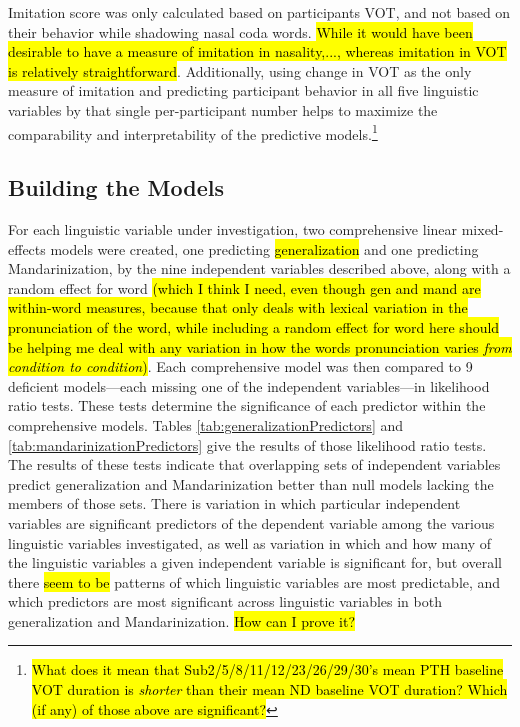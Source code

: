 Imitation score was only calculated based on participants VOT, and not based on their behavior while shadowing nasal coda words. \hl{While it would have been desirable to have a measure of imitation in nasality,..., whereas imitation in VOT is relatively straightforward}. Additionally, using change in VOT as the only measure of imitation and predicting participant behavior in all five linguistic variables by that single per-participant number helps to maximize the comparability and interpretability of the predictive models.\footnote{\hl{What does it mean that Sub2/5/8/11/12/23/26/29/30's mean PTH baseline VOT duration is \textit{shorter} than their mean ND baseline VOT duration? Which (if any) of those above are significant?}}

\subsection{Building the Models} 
For each linguistic variable under investigation, two comprehensive linear mixed-effects models were created, one predicting \hl{generalization} and one predicting Mandarinization, by the nine independent variables described above, along with a random effect for word \hl{(which I think I need, even though gen and mand are within-word measures, because that only deals with lexical variation in the pronunciation of the word, while including a random effect for word here should be helping me deal with any variation in how the words pronunciation varies \textit{from condition to condition})}. Each comprehensive model was then compared to 9 deficient models---each missing one of the independent variables---in likelihood ratio tests. These tests determine the significance of each predictor within the comprehensive models. Tables \ref{tab:generalizationPredictors} and \ref{tab:mandarinizationPredictors} give the results of those likelihood ratio tests. The results of these tests indicate that overlapping sets of independent variables predict generalization and Mandarinization better than null models lacking the members of those sets. There is variation in which particular independent variables are significant predictors of the dependent variable among the various linguistic variables investigated, as well as variation in which and how many of the linguistic variables a given independent variable is significant for, but overall there \hl{seem to be} patterns of which linguistic variables are most predictable, and which predictors are most significant across linguistic variables in both generalization and Mandarinization. \hl{How can I prove it?}

